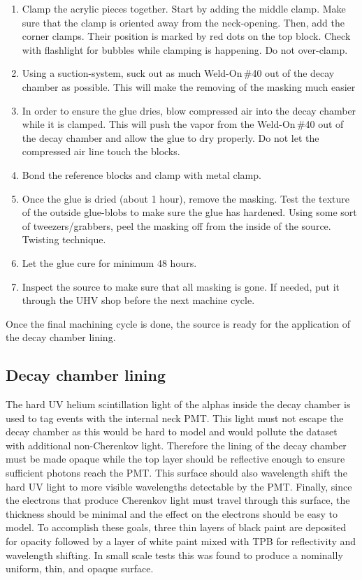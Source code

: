 \begin{enumerate}
\item Clamp the acrylic pieces together. Start by adding the middle clamp. Make sure that the clamp is oriented away from the neck-opening. Then, add the corner clamps. Their position is marked by red dots on the top block. Check with flashlight for bubbles while clamping is happening. Do not over-clamp.
\item Using a suction-system, suck out as much Weld-On\,\#40 out of the decay chamber as possible. This will make the removing of the masking much easier
\item In order to ensure the glue dries,  blow compressed air into the decay chamber while it is clamped. This will push the vapor from the Weld-On\,\#40 out of the decay chamber and allow the glue to dry properly. Do not let the compressed air line touch the blocks.
\item Bond the reference blocks and clamp with metal clamp.
\item Once the glue is dried (about 1 hour), remove the masking. Test the texture of the outside glue-blobs to make sure the glue has hardened. Using some sort of tweezers/grabbers, peel the masking off from the inside of the source. Twisting technique.
\item Let the glue cure for minimum 48 hours.
\item Inspect the source to make sure that all masking is gone. If needed, put it through the UHV shop before the next machine cycle.
\end{enumerate}

Once the final machining cycle is done, the source is ready for the application of the decay chamber lining.

\subsection{Decay chamber lining}
\label{sec:lining}
The hard UV helium scintillation light of the alphas inside the decay chamber is used to tag events with the internal neck PMT. This light must not escape the decay chamber as this would be hard to model and would pollute the dataset with additional non-Cherenkov light. Therefore the lining of the decay chamber must be made opaque while the top layer should be reflective enough to ensure sufficient photons reach the PMT. This surface should also wavelength shift the hard UV light to more visible wavelengths detectable by the PMT. Finally, since the electrons that produce Cherenkov light must travel through this surface, the thickness should be minimal and the effect on the electrons should be easy to model. To accomplish these goals, three thin layers of black paint are deposited for opacity followed by a layer of white paint mixed with TPB for reflectivity and wavelength shifting. In small scale tests this was found to produce a nominally uniform, thin, and opaque surface.

